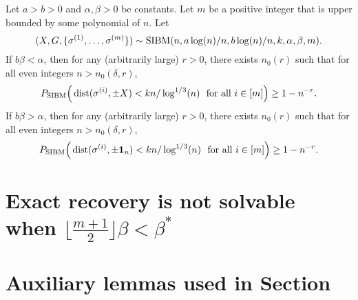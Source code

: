 \documentclass{article}
\begin{document}
\begin{proposition} \label{prop:1}
Let $a>b>0$ and $\alpha,\beta>0$ be constants. Let $m$ be a positive integer that is upper bounded by some polynomial of $n$.
Let 
$$
(X,G,\{\sigma^{(1)},\dots,\sigma^{(m)}\})\sim \operatorname{SIBM}(n,a\log(n)/n, b\log(n)/n,k, \alpha,\beta, m) .
$$
If $b\beta <\alpha$, then for any (arbitrarily large) $r>0$, there exists $n_0(r)$ such that for all even integers $n>n_0(\delta, r)$,
$$
P_{\operatorname{SIBM}} \Big(\operatorname{dist}(\sigma^{(i)},\pm X)< kn/\log^{1/3}(n)
\text{~~for all~} i\in[m] \Big) \ge 1- n^{-r} .
$$
If $b\beta >\alpha$, then for any (arbitrarily large) $r>0$, there exists $n_0(r)$ such that for all even integers $n>n_0(\delta, r)$,
$$
P_{\operatorname{SIBM}} \Big(\operatorname{dist}(\sigma^{(i)},\pm \mathbf{1}_n)< kn/\log^{1/3}(n)
\text{~~for all~} i\in[m] \Big) \ge 1- n^{-r} .
$$
\end{proposition}

\section{Exact recovery is not solvable when $\lfloor \frac{m+1}{2} \rfloor \beta < \beta^\ast$}
\label{sect:converse}

\appendix
\section{Auxiliary lemmas used in Section}
\end{document}
